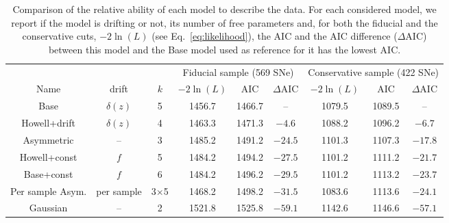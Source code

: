 \documentclass[]{aa}
\begin{document}
\begin{table}
    \centering
    \caption{Comparison of the relative ability of each model to describe the
        data. For each considered model, we report if the model is drifting or
        not, its number of free parameters and, for both the fiducial and the
        conservative cuts, $-2\ln(L)$ (see Eq.~\ref{eq:likelihood}), the AIC and
        the AIC difference ($\Delta$AIC) between this model and the Base model
        used as reference for it has the lowest AIC.}
    \label{tab:comp}
    \begin{tabular}{ccc|ccc|ccc}
        \hline\hline
        & & & \multicolumn{3}{c}{Fiducial sample (569 SNe)}
            & \multicolumn{3}{|c}{Conservative sample (422 SNe)} \\
        Name & drift & $k$ &
        $-2\ln(L)$ & AIC & $\Delta$AIC & $-2\ln(L)$ & AIC & $\Delta$AIC\\
        \hline

        Base & $\delta(z)$ & 5
        & 1456.7 & 1466.7 & -- 
        & 1079.5 & 1089.5 & -- \\

        Howell+drift & $\delta(z)$ & 4
        & 1463.3 & 1471.3 & $-4.6$
        & 1088.2 & 1096.2 & $-6.7$ 
        \\

        Asymmetric & -- & 3
        & 1485.2 & 1491.2 & $-24.5$
        & 1101.3 & 1107.3 & $-17.8$ 
        \\

        Howell+const & $f$ & 5
        & 1484.2 & 1494.2 & $-27.5$
        & 1101.2 & 1111.2 & $-21.7$ 
        \\

        Base+const & $f$ & 6
        & 1484.2 & 1496.2 & $-29.5$
        & 1101.2 & 1113.2 & $-23.7$ 
        \\

        Per sample Asym. & per sample & 3$\times$5
        & 1468.2 & 1498.2 & $-31.5$
        & 1083.6 & 1113.6 & $-24.1$ 
        \\

        Gaussian & -- & 2
        & 1521.8 & 1525.8 & $-59.1$
        & 1142.6 & 1146.6 & $-57.1$ 
        \\
        \hline
    \end{tabular}
\end{table}
\end{document}
